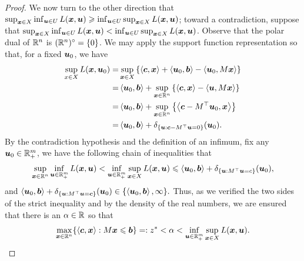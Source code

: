 \begin{proof}
We now turn to the other direction that $ \sup_{\bmx\in X} \inf_{\bmu\in U} L(\bmx, \bmu) \geq \inf_{\bmu\in U} \sup_{\bmx\in X} L(\bmx, \bmu)$; toward a contradiction, suppose that $ \sup_{\bmx\in X} \inf_{\bmu\in U} L(\bmx, \bmu) < \inf_{\bmu\in U} \sup_{\bmx\in X} L(\bmx, \bmu)$. Observe that the polar dual of $\rr^n$ is $(\rr^n)^\circ = \{0\}$. We may apply the support function representation so that, for a fixed $\bmu_0$, we have  
\begin{align*}
\sup_{x\in X} L(\bmx, \bmu_0) = & \sup_{\bmx\in X}\left\{\inner{\bmc, \bmx} + \inner{\bmu_0, \bmb}-\inner{\bmu_0, M \bmx}\right\} \\
	= 	& \inner{\bmu_0, \bmb} + \sup_{\bmx\in \rr^n}\left\{ \inner{\bmc, \bmx}-\inner{\bmu, M \bmx}\right\} \\ 
	= 	& \inner{\bmu_0, \bmb} + \sup_{\bmx\in \rr^n}\left\{ \inner{\bmc - M^\top \bmu_0, \bmx}\right\} \\ 
	= 	& \inner{\bmu_0, \bmb} + \delta_{\{\bmu: \bmc- M^\top \bmu = 0\} }(\bmu_0). \\ 
 \end{align*}
By the contradiction hypothesis and the definition of an infimum, fix any $\bmu_0\in \rr_+^m$, we have the following chain of inequalities that
\[ \sup_{\bmx\in \rr^n} \inf_{\bmu\in \rr^m_+} L(\bmx, \bmu) < \inf_{\bmu\in \rr^m_+} \sup_{\bmx\in X} L(\bmx, \bmu) \leq \inner{\bmu_0, \bmb} + \delta_{\{\bmu: M^\top \bmu = c\}}(\bmu_0), \]
and $ \inner{\bmu_0, \bmb} + \delta_{\{\bmu: M^\top \bmu = \bmc\}}(\bmu_0) \in\{ \inner{\bmu_0, \bmb}, \infty\}. $ Thus, as we verified the two sides of the strict inequality and by the density of the real numbers, we are ensured that there is an $\alpha\in\rr$ so that 
\[ \max_{\bmx\in\rr^n}\{\inner{\bmc, \bmx}: M\bmx\leq \bbb\} =:  z\rast < \alpha < \inf_{\bmu\in \rr^m_+} \sup_{\bmx\in X} L(\bmx, \bmu).  \]


\end{proof}
